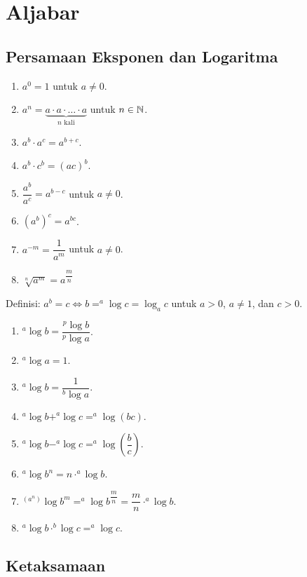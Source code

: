 \graphicspath{{./}}

\section{Aljabar}
    \subsection{Persamaan Eksponen dan Logaritma}
    \begin{enumerate}
        \item $a^0=1$ untuk $a \neq 0$.
        \item $a^n =  \underbrace{a \cdot a \cdot \ldots \cdot a}_{n \text{ kali}}$ untuk $n \in \mathbb N$.
        \item $a^b\cdot a^c=a^{b+c}$.
        \item $a^b\cdot c^b = (ac)^b$.
        \item $\dfrac{a^b}{a^c}=a^{b-c}$ untuk $a\neq 0$.
        \item $(a^b)^c=a^{bc}$.
        \item $a^{-m} = \dfrac{1}{a^m}$ untuk $a \neq 0$.
        \item $\sqrt[n]{a^m}=a^{\dfrac{m}{n}}$
    \end{enumerate}
    
    Definisi: $a^b =c \iff b = ^a \log c = \log_a c$ untuk $a> 0$, $a \neq 1$, dan $c >0$.
    \begin{enumerate}
        \item $^a \log b = \dfrac{^p \log b}{^p \log a}$.
        \item $^a \log a = 1$.
        \item $^a \log b = \dfrac{1}{^b \log a}$.
        \item $^a \log b + ^a \log c = ^a \log (bc)$.
        \item $^a \log b - ^a \log c = ^a \log \left(\dfrac{b}{c}\right)$.
        \item $^a \log b^n = n \cdot ^a \log b$.
        \item $^(a^n) \log b^m = ^a \log b^{\dfrac{m}{n}} = \dfrac{m}{n}\cdot ^a \log b$.
        \item $^a \log b \cdot ^b\log c = ^a \log c$.
    \end{enumerate}
    \subsection{Ketaksamaan}
